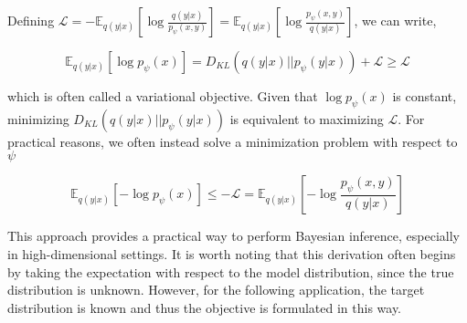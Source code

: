 Defining $\mathcal{L} = -\mathbb{E}_{q(y \lvert x)}\left[\log \frac{q(y\lvert x)}{p_{\psi}(x,y)} \right]  = \mathbb{E}_{q(y \lvert x)}\left[\log \frac{p_{\psi}(x,y)}{q(y\lvert x)} \right] $, we can write,

\begin{equation}
\mathbb{E}_{q(y \lvert x)}\left[\log p_{\psi}(x) \right] = D_{KL}(q(y \lvert x) \lvert\lvert p_{\psi}(y\lvert x)) + \mathcal{L} \geq \mathcal{L}
\end{equation}

which is often called a variational objective. Given that \( \log p_{\psi}(x) \) is constant, minimizing $D_{KL}(q(y \lvert x) \lvert\lvert p_{\psi}(y\lvert x))$ is equivalent to maximizing $\mathcal{L}$. For practical reasons, we often instead solve a minimization problem with respect to $\psi$

\begin{equation}
\mathbb{E}_{q(y \lvert x)}\left[-\log p_{\psi}(x) \right] \leq -\mathcal{L} = \mathbb{E}_{q(y \lvert x)}\left[-\log \frac{p_{\psi}(x,y)}{q(y\lvert x)} \right]
\end{equation}

This approach provides a practical way to perform Bayesian inference, especially in high-dimensional settings. It is worth noting that this derivation often begins by taking the expectation with respect to the model distribution, since the true distribution is unknown. However, for the following application, the target distribution is known and thus the objective is formulated in this way. 





